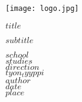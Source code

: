 \documentclass[12pt,twoside]{extarticle}
\begin{document}

\begin{titlepage}
\thispagestyle{empty}

\vspace*{-2cm}  %
\hspace*{-2.5cm}  %
\texttt{[image: logo.jpg]}
\vspace*{1cm}

\vspace*{2cm}

\begin{center}
    \Huge
    \textbf{$title$}
    
    \vspace{0.5cm}
    
    \Large
    $subtitle$
\end{center}

\vfill

{
\begin{flushright}
    \large
    $school$ \\
    $studies$ \\
    $direction$ \\
    \vspace{1cm}
    $tyon_tyyppi$ \\
    $author$ \\
    \vspace{1cm}
    $date$ \\
    $place$
\end{flushright}
}

\end{titlepage}

\newpage
\thispagestyle{plain}


\fancyhf{} %
\fancyhead[RE]{\leftmark}
\fancyhead[LO]{\leftmark}
\fancyfoot[LE]{{\fontsize{14pt}{16.8pt}\selectfont\thepage}}
\fancyfoot[RO]{{\fontsize{14pt}{16.8pt}\selectfont\thepage}}
\end{document}
